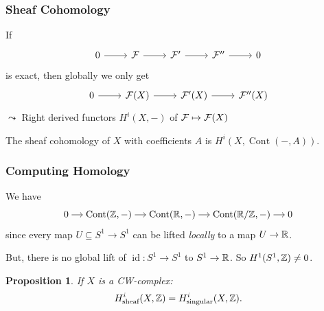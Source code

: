 \documentclass{beamer}
\newtheorem{proposition}{Proposition}
\DeclareMathOperator{\Cont}{Cont}
\DeclareMathOperator{\id}{id}
\begin{document}
\begin{frame}
    \frametitle{Sheaf Cohomology}

    If
    \begin{equation*}
        \begin{tikzcd}[ampersand replacement=\&]
            0 \rar \& \mcF \rar \& \mcF' \rar \& \mcF'' \rar \& 0
        \end{tikzcd}
    \end{equation*}
    is exact, then globally we only get
    \begin{equation*}
        \begin{tikzcd}[ampersand replacement=\&]
            0 \rar \& \mcF(X) \rar \& \mcF'(X) \rar \& \mcF''(X)
        \end{tikzcd}
    \end{equation*}
    \pause
    $\leadsto$ Right derived functors $H^i(X, -)$ of $\mathcal{F} \mapsto \mathcal{F}(X)$
    \begin{definition}
        The sheaf cohomology of $X$ with coefficients $A$ is $H^i(X, \Cont(- , A))$.
    \end{definition}

\end{frame}

\begin{frame}
    \frametitle{Computing Homology}

    We have
    \begin{equation*}
        \begin{tikzcd}[ampersand replacement=\&, sep=small, cramped]
            0 \rar \& \Cont(\bbZ, -) \rar \& \Cont(\bbR, -) \rar
            \& \Cont(\bbR/\bbZ, -) \rar \& 0
        \end{tikzcd}
    \end{equation*}
    since every map $U\subseteq S^1 \to S^1$ can be
    lifted \emph{locally} to a map $U \to \mathbb{R}$.

    \medskip
    But, there is no global lift of $\id\colon S^1 \to S^1$
    to $S^1 \to \mathbb{R}$.
    So $H^1(S^1, \mathbb{Z}) \neq 0$.

    \medskip
    \pause
    \begin{proposition}
        If $X$ is a CW-complex:
        \begin{equation*}
            H^i_{\text{sheaf}}(X, \mathbb{Z}) = H^i_{\text{singular}}(X, \mathbb{Z}).
        \end{equation*}
    \end{proposition}

\end{frame}
\end{document}
